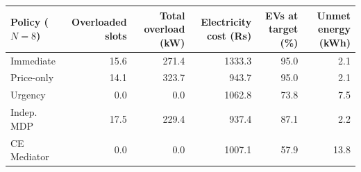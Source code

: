 \begin{tabular}{lrrrrr}
\toprule
Policy ($N=8$) & Overloaded slots & Total overload (kW) & Electricity cost (Rs) & EVs at target (\%) & Unmet energy (kWh) \\
\midrule
        Immediate & 15.6 & 271.4 & 1333.3 & 95.0 & 2.1 \\
        Price-only & 14.1 & 323.7 & 943.7 & 95.0 & 2.1 \\
        Urgency & 0.0 & 0.0 & 1062.8 & 73.8 & 7.5 \\
        Indep. MDP & 17.5 & 229.4 & 937.4 & 87.1 & 2.2 \\
        CE Mediator & 0.0 & 0.0 & 1007.1 & 57.9 & 13.8 \\
\bottomrule
\end{tabular}
